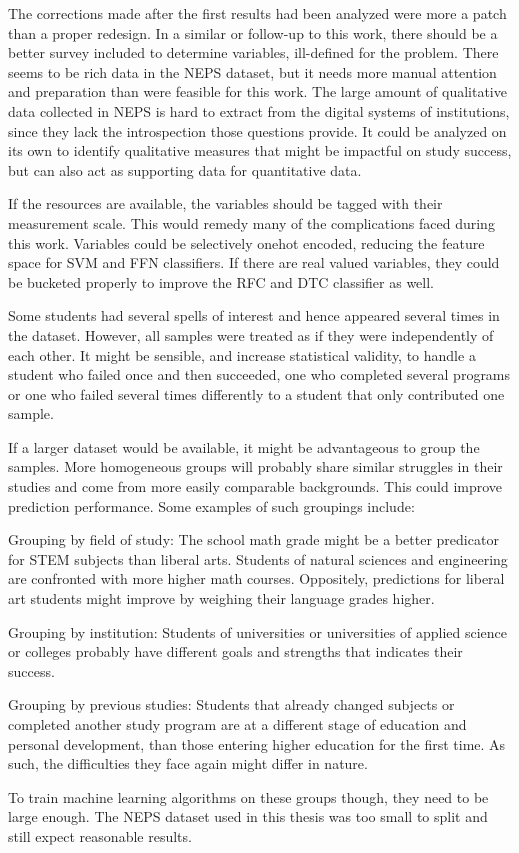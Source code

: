 The corrections made after the first results had been analyzed were more a patch than a proper redesign. In a similar or follow-up to this work, there should be a better survey included to determine variables, ill-defined for the problem. There seems to be rich data in the NEPS dataset, but it needs more manual attention and preparation than were feasible for this work. The large amount of qualitative data collected in NEPS is hard to extract from the digital systems of institutions, since they lack the introspection those questions provide. It could be analyzed on its own to identify qualitative measures that might be impactful on study success, but can also act as supporting data for quantitative data.

If the resources are available, the variables should be tagged with their measurement scale. This would remedy many of the complications faced during this work. Variables could be selectively onehot encoded, reducing the feature space for SVM and FFN classifiers. If there are real valued variables, they could be bucketed properly to improve the RFC and DTC classifier as well.

Some students had several spells of interest and hence appeared several times in the dataset. However, all samples were treated as if they were independently of each other. It might be sensible, and increase statistical validity, to handle a student who failed once and then succeeded, one who completed several programs or one who failed several times differently to a student that only contributed one sample.

If a larger dataset would be available, it might be advantageous to group the samples. More homogeneous groups will probably share similar struggles in their studies and come from more easily comparable backgrounds. This could improve prediction performance. Some examples of such groupings include:
\begin{enumerate*}[label=(\arabic*)]
    \item Grouping by field of study: The school math grade might be a better predicator for STEM subjects than liberal arts. Students of natural sciences and engineering are confronted with more higher math courses. Oppositely, predictions for liberal art students might improve by weighing their language grades higher.
    \item Grouping by institution: Students of universities or universities of applied science or colleges probably have different goals and strengths that indicates their success.
    \item Grouping by previous studies: Students that already changed subjects or completed another study program are at a different stage of education and personal development, than those entering higher education for the first time. As such, the difficulties they face again might differ in nature.
\end{enumerate*}
To train machine learning algorithms on these groups though, they need to be large enough. The NEPS dataset used in this thesis was too small to split and still expect reasonable results.

